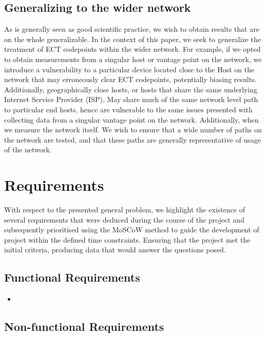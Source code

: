 \documentclass{l4proj}
\begin{document}
\subsection{Generalizing to the wider network}

As is generally seen as good scientific practice, we wish to obtain results that are on the whole generalizable. In the context of this paper, we seek to generalize the treatment of ECT codepoints within the wider network. For example, if we opted to obtain measurements from a singular host or vantage point on the network, we introduce a vulnerability to a particular device located close to the Host on the network that may erroneously clear ECT codepoints, potentially biasing results. Additionally, geographically close hosts, or hosts that share the same underlying Internet Service Provider (ISP). May share much of the same network level path to particular end hosts, hence are vulnerable to the same issues presented with collecting data from a singular vantage point on the network. Additionally, when we measure the network itself. We wish to ensure that a wide number of paths on the network are tested, and that these paths are generally representative of usage of the network.


\section{Requirements}

With respect to the presented general problem, we highlight the existence of several requirements that were deduced during the course of the project and subsequently prioritised using the MoSCoW method to guide the development of project within the defined time constraints. Ensuring that the project met the initial criteria, producing data that would answer the questions posed.

\subsection{Functional Requirements}

\begin{itemize}
    \item 
\end{itemize}



\subsection{Non-functional Requirements}
\end{document}
